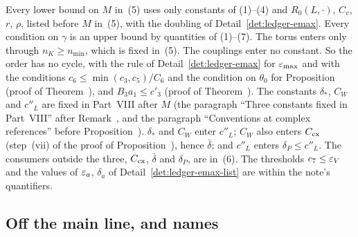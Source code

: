 Every lower bound on $M$ in~(5) uses only constants of (1)--(4) and $R_0(L,\cdot)$, $C_v$, $r$, $\rho$, listed before $M$ in~(5), with the doubling of Detail~\ref{det:ledger-emax}. Every condition on $\gamma$ is an upper bound by quantities of (1)--(7). The torus enters only through $n_K\ge n_{\min}$, which is fixed in~(5). The couplings enter no constant. So the order has no cycle, with the rule of Detail~\ref{det:ledger-emax} for $\varepsilon_{\max}$ and with the conditions $c_6\le\min(c_3,c_5)/C_6$ and the condition on $\theta_0$ for Proposition~ (proof of Theorem~), and $B_3a_1\le c'_3$ (proof of Theorem~). The constants $\delta_*$, $C_W$ and $c''_L$ are fixed in Part~VIII after $M$ (the paragraph ``Three constants fixed in Part~VIII'' after Remark~, and the paragraph ``Conventions at complex references'' before Proposition~). $\delta_*$ and $C_W$ enter $c''_L$; $C_W$ also enters $C_{\rm cx}$ (step~(vii) of the proof of Proposition~), hence $\bar\delta$; and $c''_L$ enters $\delta_P\le c''_L$. The consumers outside the three, $C_{\rm cx}$, $\bar\delta$ and $\delta_P$, are in~(6). The thresholds $c_7\le\varepsilon_V$ and the values of $\varepsilon_a$, $\delta_a$ of Detail~\ref{det:ledger-emax-list} are within the note's quantifiers.

\subsection{Off the main line, and names}\label{subsec:ledger-names}


